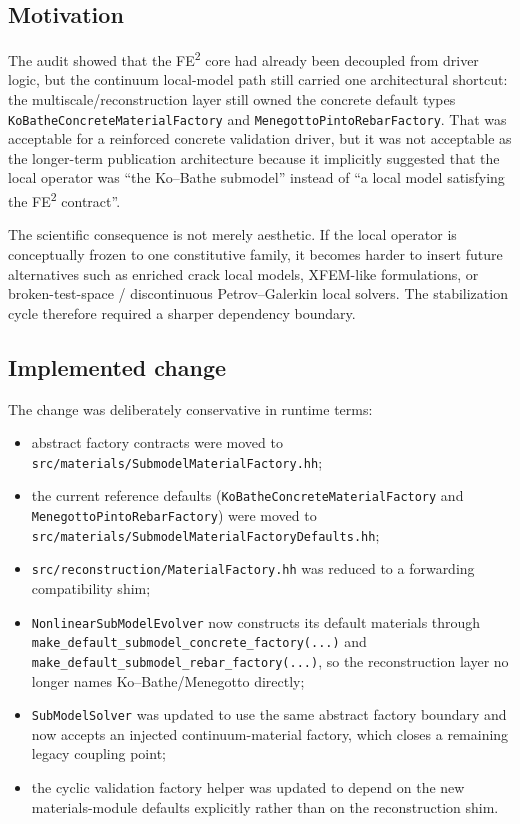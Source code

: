 \subsection{Motivation}

The audit showed that the FE\textsuperscript{2} core had already been decoupled
from driver logic, but the continuum local-model path still carried one
architectural shortcut: the multiscale/reconstruction layer still owned the
concrete default types \texttt{KoBatheConcreteMaterialFactory} and
\texttt{MenegottoPintoRebarFactory}.  That was acceptable for a reinforced
concrete validation driver, but it was not acceptable as the longer-term
publication architecture because it implicitly suggested that the local
operator was ``the Ko--Bathe submodel'' instead of ``a local model satisfying
the FE\textsuperscript{2} contract''.

The scientific consequence is not merely aesthetic.  If the local operator is
conceptually frozen to one constitutive family, it becomes harder to insert
future alternatives such as enriched crack local models, XFEM-like
formulations, or broken-test-space / discontinuous Petrov--Galerkin local
solvers.  The stabilization cycle therefore required a sharper dependency
boundary.

\subsection{Implemented change}

The change was deliberately conservative in runtime terms:
\begin{itemize}
  \item abstract factory contracts were moved to
    \texttt{src/materials/SubmodelMaterialFactory.hh};
  \item the current reference defaults
    (\texttt{KoBatheConcreteMaterialFactory} and
    \texttt{MenegottoPintoRebarFactory}) were moved to
    \texttt{src/materials/SubmodelMaterialFactoryDefaults.hh};
  \item \texttt{src/reconstruction/MaterialFactory.hh} was reduced to a
    forwarding compatibility shim;
  \item \texttt{NonlinearSubModelEvolver} now constructs its default materials
    through \texttt{make\_default\_submodel\_concrete\_factory(...)} and
    \texttt{make\_default\_submodel\_rebar\_factory(...)}, so the
    reconstruction layer no longer names Ko--Bathe/Menegotto directly;
  \item \texttt{SubModelSolver} was updated to use the same abstract factory
    boundary and now accepts an injected continuum-material factory, which
    closes a remaining legacy coupling point;
  \item the cyclic validation factory helper was updated to depend on the new
    materials-module defaults explicitly rather than on the reconstruction shim.
\end{itemize}


